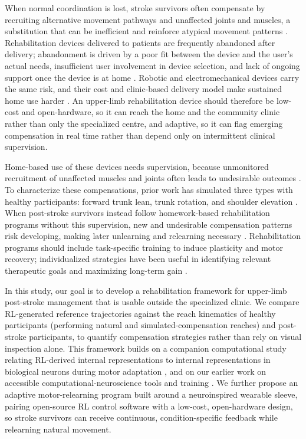 \documentclass[11pt]{article}
\begin{document}
When normal coordination is lost, stroke survivors often compensate by recruiting alternative movement pathways and unaffected joints and muscles, a substitution that can be inefficient and reinforce atypical movement patterns \citep{Dolatabadi2017}. Rehabilitation devices delivered to patients are frequently abandoned after delivery; abandonment is driven by a poor fit between the device and the user's actual needs, insufficient user involvement in device selection, and lack of ongoing support once the device is at home \citep{Sugawara2018}. Robotic and electromechanical devices carry the same risk, and their cost and clinic-based delivery model make sustained home use harder \citep{Mehrholz2015}. An upper-limb rehabilitation device should therefore be low-cost and open-hardware, so it can reach the home and the community clinic rather than only the specialized centre, and adaptive, so it can flag emerging compensation in real time rather than depend only on intermittent clinical supervision.

Home-based use of these devices needs supervision, because unmonitored recruitment of unaffected muscles and joints often leads to undesirable outcomes \citep{Zhi2018}. To characterize these compensations, prior work has simulated three types with healthy participants: forward trunk lean, trunk rotation, and shoulder elevation \citep{Zhi2018,Dolatabadi2017}. When post-stroke survivors instead follow homework-based rehabilitation programs without this supervision, new and undesirable compensation patterns risk developing, making later unlearning and relearning necessary \citep{Lin2019}. Rehabilitation programs should include task-specific training to induce plasticity and motor recovery; individualized strategies have been useful in identifying relevant therapeutic goals and maximizing long-term gain \citep{Takeuchi2013}.

In this study, our goal is to develop a rehabilitation framework for upper-limb post-stroke management that is usable outside the specialized clinic. We compare RL-generated reference trajectories against the reach kinematics of healthy participants (performing natural and simulated-compensation reaches) and post-stroke participants, to quantify compensation strategies rather than rely on visual inspection alone. This framework builds on a companion computational study relating RL-derived internal representations to internal representations in biological neurons during motor adaptation \citep{Ohue2026}, and on our earlier work on accessible computational-neuroscience tools and training \citep{Chinagorom2025,OhuePythonUnpub}. We further propose an adaptive motor-relearning program built around a neuroinspired wearable sleeve, pairing open-source RL control software with a low-cost, open-hardware design, so stroke survivors can receive continuous, condition-specific feedback while relearning natural movement.
\end{document}
